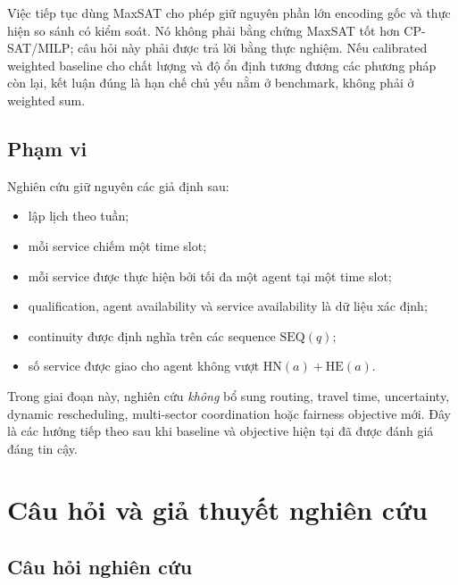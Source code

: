 \documentclass[12pt,a4paper]{article}
\newcommand{\SEQ}{\mathrm{SEQ}}
\newcommand{\HN}{\mathrm{HN}}
\newcommand{\HE}{\mathrm{HE}}
\begin{document}
Việc tiếp tục dùng MaxSAT cho phép giữ nguyên phần lớn encoding gốc và thực hiện
so sánh có kiểm soát. Nó không phải bằng chứng MaxSAT tốt hơn CP-SAT/MILP; câu
hỏi này phải được trả lời bằng thực nghiệm. Nếu calibrated weighted baseline
cho chất lượng và độ ổn định tương đương các phương pháp còn lại, kết luận đúng
là hạn chế chủ yếu nằm ở benchmark, không phải ở weighted sum.

\subsection{Phạm vi}

Nghiên cứu giữ nguyên các giả định sau:
\begin{itemize}
  \item lập lịch theo tuần;
  \item mỗi service chiếm một time slot;
  \item mỗi service được thực hiện bởi tối đa một agent tại một time slot;
  \item qualification, agent availability và service availability là dữ liệu
        xác định;
  \item continuity được định nghĩa trên các sequence $\SEQ(q)$;
  \item số service được giao cho agent không vượt $\HN(a)+\HE(a)$.
\end{itemize}

Trong giai đoạn này, nghiên cứu \emph{không} bổ sung routing, travel time,
uncertainty, dynamic rescheduling, multi-sector coordination hoặc fairness
objective mới. Đây là các hướng tiếp theo sau khi baseline và objective hiện
tại đã được đánh giá đáng tin cậy.

\section{Câu hỏi và giả thuyết nghiên cứu}

\subsection{Câu hỏi nghiên cứu}
\end{document}
